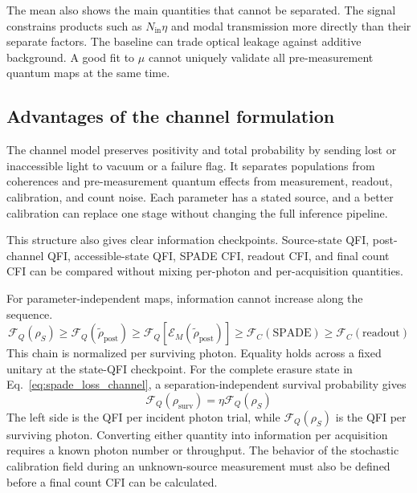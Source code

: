 The mean also shows the main quantities that cannot be separated.  The signal constrains products such as $N_{\mathrm{in}}\eta$ and modal transmission more directly than their separate factors.  The baseline can trade optical leakage against additive background.  A good fit to $\mu$ cannot uniquely validate all pre-measurement quantum maps at the same time.

\subsection{Advantages of the channel formulation}

The channel model preserves positivity and total probability by sending lost or inaccessible light to vacuum or a failure flag.  It separates populations from coherences and pre-measurement quantum effects from measurement, readout, calibration, and count noise.  Each parameter has a stated source, and a better calibration can replace one stage without changing the full inference pipeline.

This structure also gives clear information checkpoints.  Source-state QFI, post-channel QFI, accessible-state QFI, SPADE CFI, readout CFI, and final count CFI can be compared without mixing per-photon and per-acquisition quantities.

For parameter-independent maps, information cannot increase along the sequence.
\begin{equation}
    \mathcal{F}_Q(\rho_S)
    \geq \mathcal{F}_Q(\widetilde{\rho}_{\mathrm{post}})
    \geq \mathcal{F}_Q[\mathcal{E}_M(\widetilde{\rho}_{\mathrm{post}})]
    \geq \mathcal{F}_{C}(\text{SPADE})
    \geq \mathcal{F}_{C}(\text{readout})
    \label{eq:spade_information_processing_chain}
\end{equation}
This chain is normalized per surviving photon. Equality holds across a fixed unitary at the state-QFI checkpoint. For the complete erasure state in Eq.~\eqref{eq:spade_loss_channel}, a separation-independent survival probability gives
\begin{equation}
    \mathcal{F}_Q(\rho_{\mathrm{surv}})
    =\eta\mathcal{F}_Q(\rho_S)
    \label{eq:spade_qfi_survival_scaling}
\end{equation}
The left side is the QFI per incident photon trial, while $\mathcal{F}_Q(\rho_S)$ is the QFI per surviving photon. Converting either quantity into information per acquisition requires a known photon number or throughput.  The behavior of the stochastic calibration field during an unknown-source measurement must also be defined before a final count CFI can be calculated.


